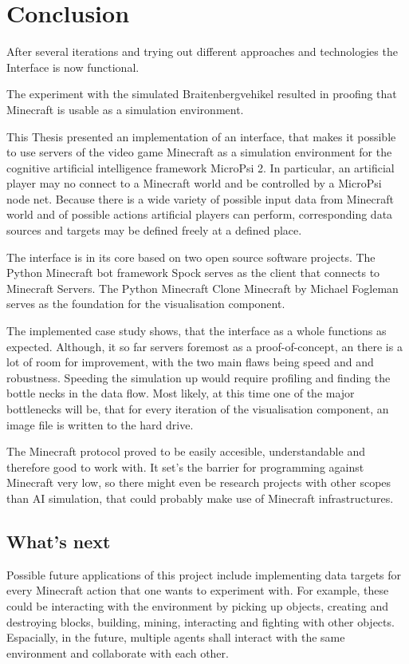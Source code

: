 \chapter{Conclusion}
After several iterations and trying out different approaches and technologies the Interface is now functional.

The experiment with the simulated Braitenbergvehikel resulted in proofing that Minecraft is usable as a simulation environment.

This Thesis presented an implementation of an interface, that makes it possible to use servers of the video game Minecraft as a simulation environment for the cognitive artificial intelligence framework MicroPsi 2. In particular, an artificial player may no connect to a Minecraft world and be controlled by a MicroPsi node net. Because there is a wide variety of possible input data from Minecraft world and of possible actions artificial players can perform, corresponding data sources and targets may be defined freely at a defined place.

The interface is in its core based on two open source software projects. The Python Minecraft bot framework Spock serves as the client that connects to Minecraft Servers. The Python Minecraft Clone Minecraft by Michael Fogleman serves as the foundation for the visualisation component.

The implemented case study shows, that the interface as a whole functions as expected. Although, it so far servers foremost as a proof-of-concept, an there is a lot of room for improvement, with the two main flaws being speed and and robustness. Speeding the simulation up would require profiling and finding the bottle necks in the data flow. Most likely, at this time one of the major bottlenecks will be, that for every iteration of the visualisation component, an image file is written to the hard drive.

The Minecraft protocol proved to be easily accesible, understandable and therefore good to work with. It set's the barrier for programming against Minecraft very low, so there might even be research projects with other scopes than AI simulation, that could probably make use of Minecraft infrastructures.

\section{What's next}
Possible future applications of this project include implementing data targets for every Minecraft action that one wants to experiment with. For example, these could be interacting with the environment by picking up objects, creating and destroying blocks, building, mining, interacting and fighting with other objects. Espacially, in the future, multiple agents shall interact with the same environment and collaborate with each other.